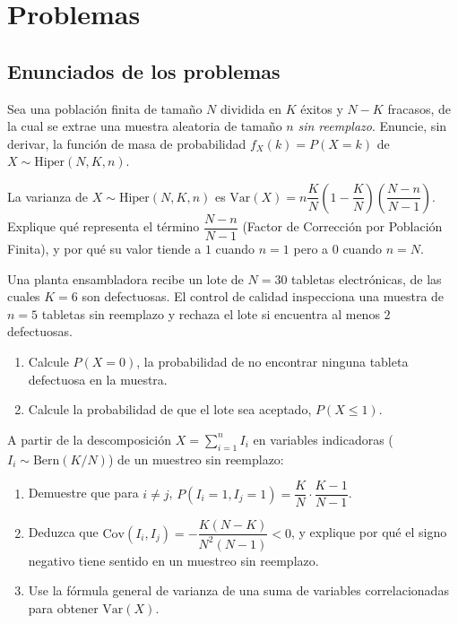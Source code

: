 \section*{Problemas}

\subsection*{Enunciados de los problemas}

\begin{problema}
	\label{prob:748a77d}
	Sea una población finita de tamaño $N$ dividida en $K$ éxitos y $N-K$ fracasos, de la cual se extrae una muestra aleatoria de tamaño $n$ \emph{sin reemplazo}. Enuncie, sin derivar, la función de masa de probabilidad $f_X(k)=P(X=k)$ de $X \sim \text{Hiper}(N,K,n)$.
\end{problema}

\begin{problema}
	\label{prob:5e6e8bf}
	La varianza de $X \sim \text{Hiper}(N,K,n)$ es $\text{Var}(X) = n\dfrac{K}{N}\left(1-\dfrac{K}{N}\right)\left(\dfrac{N-n}{N-1}\right)$. Explique qué representa el término $\dfrac{N-n}{N-1}$ (Factor de Corrección por Población Finita), y por qué su valor tiende a $1$ cuando $n=1$ pero a $0$ cuando $n=N$.
\end{problema}

\begin{problema}
	\label{prob:1651c98}
	Una planta ensambladora recibe un lote de $N=30$ tabletas electrónicas, de las cuales $K=6$ son defectuosas. El control de calidad inspecciona una muestra de $n=5$ tabletas sin reemplazo y rechaza el lote si encuentra al menos $2$ defectuosas.
	\begin{enumerate}
		\item Calcule $P(X=0)$, la probabilidad de no encontrar ninguna tableta defectuosa en la muestra.
		\item Calcule la probabilidad de que el lote sea aceptado, $P(X\le1)$.
	\end{enumerate}
\end{problema}

\begin{problema}
	\label{prob:64e9a8d}
	A partir de la descomposición $X=\sum_{i=1}^n I_i$ en variables indicadoras ($I_i\sim\text{Bern}(K/N)$) de un muestreo sin reemplazo:
	\begin{enumerate}
		\item Demuestre que para $i\neq j$, $P(I_i=1,I_j=1) = \dfrac{K}{N}\cdot\dfrac{K-1}{N-1}$.
		\item Deduzca que $\text{Cov}(I_i,I_j) = -\dfrac{K(N-K)}{N^2(N-1)} < 0$, y explique por qué el signo negativo tiene sentido en un muestreo sin reemplazo.
		\item Use la fórmula general de varianza de una suma de variables correlacionadas para obtener $\text{Var}(X)$.
	\end{enumerate}
\end{problema}

